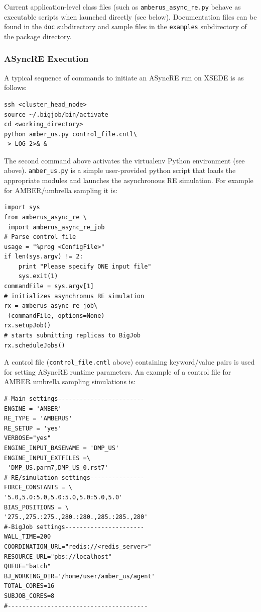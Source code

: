 \documentclass{sig-alternate}
\begin{document}
Current application-level class files (such as
\verb+amberus_async_re.py+ behave as executable scripts when launched
directly (see below). Documentation files can be found in the
\verb+doc+ subdirectory and sample files in the \verb+examples+
subdirectory of the package directory.

\subsubsection{ASyncRE Execution}

A typical sequence of commands to initiate an ASyncRE run on XSEDE is as follows:

\begin{lstlisting}[frame=single]
ssh <cluster_head_node>
source ~/.bigjob/bin/activate
cd <working_directory>
python amber_us.py control_file.cntl\
 > LOG 2>& &
\end{lstlisting}

The second command above activates the virtualenv Python environment (see above). \verb+amber_us.py+ is a simple user-provided python script that loads the appropriate modules and launches the asynchronous RE simulation. For example for AMBER/umbrella sampling it is:

\begin{lstlisting}[frame=single]
import sys
from amberus_async_re \
 import amberus_async_re_job
# Parse control file
usage = "%prog <ConfigFile>"
if len(sys.argv) != 2:
    print "Please specify ONE input file"
    sys.exit(1)    
commandFile = sys.argv[1]
# initializes asynchronus RE simulation
rx = amberus_async_re_job\
 (commandFile, options=None)
rx.setupJob()
# starts submitting replicas to BigJob
rx.scheduleJobs()
\end{lstlisting}

A control file (\verb+control_file.cntl+ above) containing keyword/value pairs is used for setting ASyncRE runtime parameters. An example of a control file for AMBER umbrella sampling simulations is:

\begin{lstlisting}[frame=single]
#-Main settings------------------------
ENGINE = 'AMBER'
RE_TYPE = 'AMBERUS'
RE_SETUP = 'yes'
VERBOSE="yes"
ENGINE_INPUT_BASENAME = 'DMP_US'
ENGINE_INPUT_EXTFILES =\
 'DMP_US.parm7,DMP_US_0.rst7'
#-RE/simulation settings---------------
FORCE_CONSTANTS = \
'5.0,5.0:5.0,5.0:5.0,5.0:5.0,5.0'
BIAS_POSITIONS = \
'275.,275.:275.,280.:280.,285.:285.,280'
#-BigJob settings----------------------
WALL_TIME=200
COORDINATION_URL="redis://<redis_server>"
RESOURCE_URL="pbs://localhost"
QUEUE="batch"
BJ_WORKING_DIR='/home/user/amber_us/agent'
TOTAL_CORES=16
SUBJOB_CORES=8
#---------------------------------------
\end{lstlisting}
\end{document}
